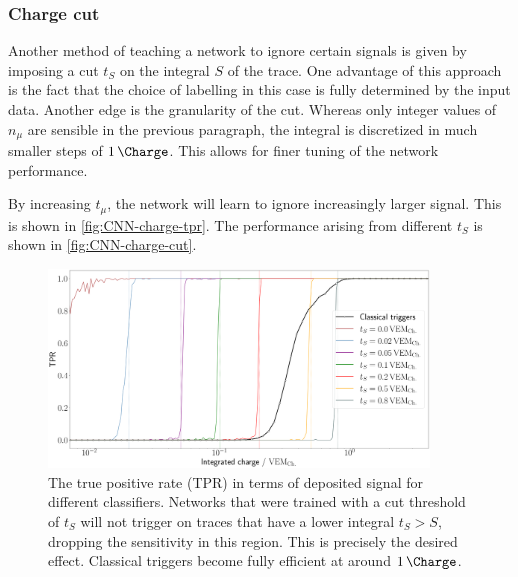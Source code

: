 \subsubsection{Charge cut}
\label{sssec:charge-cut}

Another method of teaching a network to ignore certain signals is given by imposing a cut $t_S$ on the integral $S$ of the trace. One advantage of this approach is
the fact that the choice of labelling in this case is fully determined by the input data. Another edge is the granularity of the cut. Whereas only integer values 
of $n_\mu$ are sensible in the previous paragraph, the integral is discretized in much smaller steps of $\SI[per-mode=power]{1}{\per\Charge}$. This allows for 
finer tuning of the network performance.

By increasing $t_\mu$, the network will learn to ignore increasingly larger signal. This is shown in \autoref{fig:CNN-charge-tpr}. The performance arising from 
different $t_S$ is shown in \autoref{fig:CNN-charge-cut}.

\begin{figure}
	\centering
	\includegraphics[width=0.9\textwidth]{./plots/CNN_charge_TPR.png}
	\caption{The true positive rate (TPR) in terms of deposited signal for different classifiers. Networks that were trained with a cut threshold of $t_S$ will not
	trigger on traces that have a lower integral $t_S > S$, dropping the sensitivity in this region. This is precisely the desired effect. Classical triggers 
	become fully efficient at around $\SI{1}{\Charge}$.}
	\label{fig:CNN-charge-tpr}
\end{figure}

